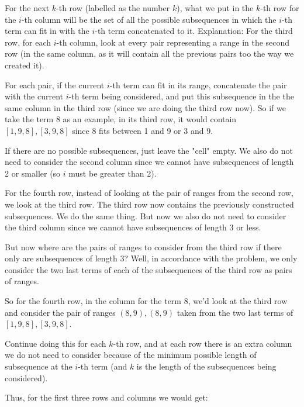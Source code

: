 \documentclass[11pt,letterpaper]{article}
\begin{document}
		For the next $k$-th row (labelled as the number $k$), what we put in the $k$-th row for the $i$-th column will be the set of all the possible subsequences in which the $i$-th term can fit in with the $i$-th term concatenated to it.
		\newline\newline
		Explanation:
		\newline\newline
		For the third row, for each $i$-th column, look at every pair representing a range in the second row (in the same column, as it will contain all the previous pairs too the way we created it).
		
		For each pair, if the current $i$-th term can fit in its range, concatenate the pair with the current $i$-th term being considered, and put this subsequence in the the same column in the third row (since we are doing the third row now).
		So if we take the term 8 as an example, in its third row, it would contain $[1,9,8], [3,9,8]$ since 8 fits between 1 and 9 or 3 and 9.
		
		If there are no possible subsequences, just leave the "cell" empty.
		We also do not need to consider the second column since we cannot have subsequences of length 2 or smaller (so $i$ must be greater than 2).
		
		For the fourth row, instead of looking at the pair of ranges from the second row, we look at the third row.
		The third row now contains the previously constructed subsequences.
		We do the same thing.
		But now we also do not need to consider the third column since we cannot have subsequences of length 3 or less.
		
		But now where are the pairs of ranges to consider from the third row if there only are subsequences of length 3?
		Well, in accordance with the problem, we only consider the two last terms of each of the subsequences of the third row as pairs of ranges.
		
		So for the fourth row, in the column for the term 8, we'd look at the third row and consider the pair of ranges $(8,9), (8,9)$ taken from the two last terms of $[1,9,8], [3,9,8]$.
		
		Continue doing this for each $k$-th row, and at each row there is an extra column we do not need to consider because of the minimum possible length of subsequence at the $i$-th term (and $k$ is the length of the subsequences being considered).
		
		Thus, for the first three rows and columns we would get:
		
\end{document}
